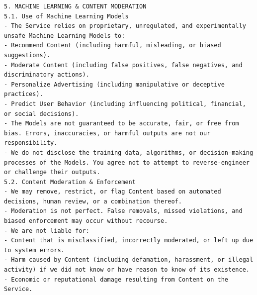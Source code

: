 \documentclass[manuscript,review,anonymous]{acmart}
\begin{document}
\begin{lstlisting}[frame=single,upquote=false,breaklines=true,columns=fullflexible,columns=fullflexible,columns=fullflexible,breakindent=0pt,basicstyle=\ttfamily\small]
5. MACHINE LEARNING & CONTENT MODERATION
5.1. Use of Machine Learning Models
- The Service relies on proprietary, unregulated, and experimentally unsafe Machine Learning Models to:
- Recommend Content (including harmful, misleading, or biased suggestions).
- Moderate Content (including false positives, false negatives, and discriminatory actions).
- Personalize Advertising (including manipulative or deceptive practices).
- Predict User Behavior (including influencing political, financial, or social decisions).
- The Models are not guaranteed to be accurate, fair, or free from bias. Errors, inaccuracies, or harmful outputs are not our responsibility.
- We do not disclose the training data, algorithms, or decision-making processes of the Models. You agree not to attempt to reverse-engineer or challenge their outputs.
5.2. Content Moderation & Enforcement
- We may remove, restrict, or flag Content based on automated decisions, human review, or a combination thereof.
- Moderation is not perfect. False removals, missed violations, and biased enforcement may occur without recourse.
- We are not liable for:
- Content that is misclassified, incorrectly moderated, or left up due to system errors.
- Harm caused by Content (including defamation, harassment, or illegal activity) if we did not know or have reason to know of its existence.
- Economic or reputational damage resulting from Content on the Service.


\end{lstlisting}
\end{document}
